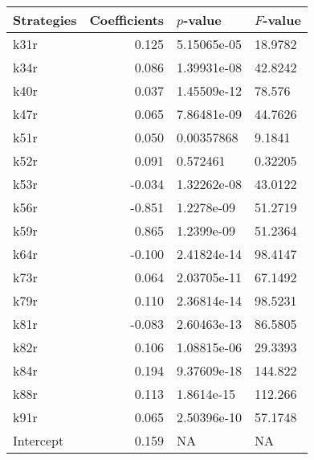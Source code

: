 \begin{tabular}{lrll}
\toprule
Strategies &  Coefficients &    $p$-value & $F$-value \\
\midrule
      k31r &         0.125 &  5.15065e-05 &   18.9782 \\
      k34r &         0.086 &  1.39931e-08 &   42.8242 \\
      k40r &         0.037 &  1.45509e-12 &    78.576 \\
      k47r &         0.065 &  7.86481e-09 &   44.7626 \\
      k51r &         0.050 &   0.00357868 &    9.1841 \\
      k52r &         0.091 &     0.572461 &   0.32205 \\
      k53r &        -0.034 &  1.32262e-08 &   43.0122 \\
      k56r &        -0.851 &   1.2278e-09 &   51.2719 \\
      k59r &         0.865 &   1.2399e-09 &   51.2364 \\
      k64r &        -0.100 &  2.41824e-14 &   98.4147 \\
      k73r &         0.064 &  2.03705e-11 &   67.1492 \\
      k79r &         0.110 &  2.36814e-14 &   98.5231 \\
      k81r &        -0.083 &  2.60463e-13 &   86.5805 \\
      k82r &         0.106 &  1.08815e-06 &   29.3393 \\
      k84r &         0.194 &  9.37609e-18 &   144.822 \\
      k88r &         0.113 &   1.8614e-15 &   112.266 \\
      k91r &         0.065 &  2.50396e-10 &   57.1748 \\
 Intercept &         0.159 &           NA &        NA \\
\bottomrule
\end{tabular}
